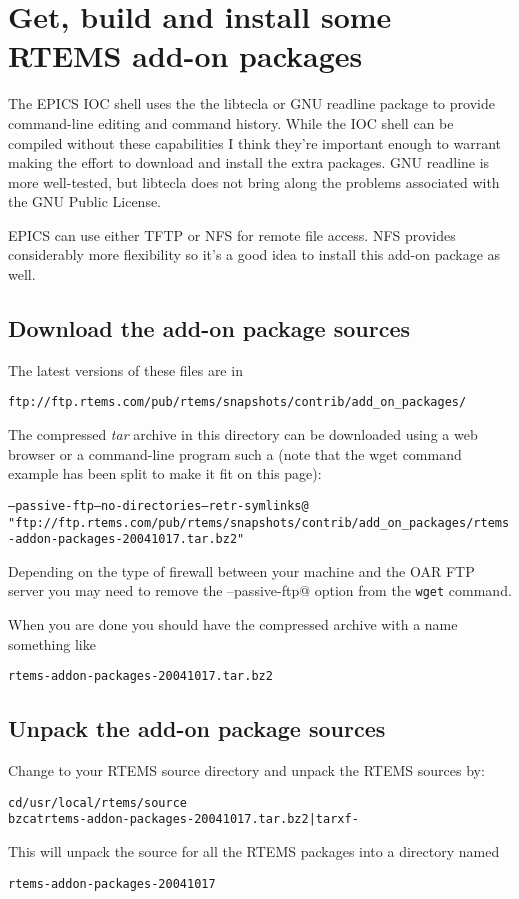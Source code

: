 \documentclass{report}
\newcommand{\rtemsPackages}{20041017}
\begin{document}
\section{Get, build and install some RTEMS add-on packages}
The EPICS IOC shell uses the the libtecla or GNU readline package to provide command-line editing and command history.
While the IOC shell can be compiled without these capabilities I think they're important enough to warrant
making the effort to download and install the extra packages.
GNU readline is more well-tested, but libtecla does not bring along
the problems associated with the GNU Public License.

EPICS can use either TFTP or NFS for remote file access.
NFS provides considerably more flexibility so it's a good
idea to install this add-on package as well.

\subsection{Download the add-on package sources}
The latest versions of these files are in
\begin{verbatim}
ftp://ftp.rtems.com/pub/rtems/snapshots/contrib/add_on_packages/
\end{verbatim}

The compressed {\it tar} archive in this directory can be downloaded using a web browser or a command-line program such a \verb@wget@ (note that the
wget command example has been split to make it fit on this page):
{\small
\begin{alltt}
\verb@wget --passive-ftp --no-directories --retr-symlinks@
\hspace{0.3in}"ftp://ftp.rtems.com/pub/rtems/snapshots/contrib/add_on_packages/rtems-addon-packages-\rtemsPackages.tar.bz2"
\end{alltt}
}
Depending on the type of firewall between your machine and the OAR FTP server
you may need to remove the \verb@--passive-ftp@ option from the {\tt wget} command.


When you are done you should have the compressed archive with a name something like
\begin{alltt}
rtems-addon-packages-\rtemsPackages.tar.bz2
\end{alltt}

\subsection{Unpack the add-on package sources}
Change to your RTEMS source directory and unpack the RTEMS sources by:
\begin{alltt}
cd /usr/local/rtems/source
bzcat rtems-addon-packages-\rtemsPackages.tar.bz2 | tar xf -
\end{alltt}
This will unpack the source for all the RTEMS packages into a directory named
\begin{alltt}
rtems-addon-packages-\rtemsPackages
\end{alltt}
\end{document}
